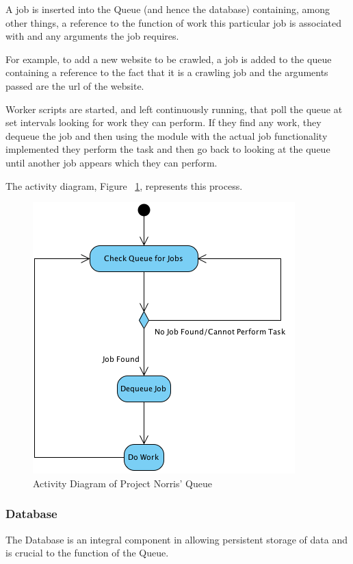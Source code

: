 \documentclass[12pt,a4paper]{article}
\begin{document}
A job is inserted into the Queue (and hence the database) containing, among other things, a reference to the function of work this particular job is associated with and any arguments the job requires.

For example, to add a new website to be crawled, a job is added to the queue containing a reference to the fact that it is a crawling job and the arguments passed are the url of the website.

Worker scripts are started, and left continuously running, that poll the queue at set intervals looking for work they can perform.  If they find any work, they dequeue the job and then using the module with the actual job functionality implemented they perform the task and then go back to looking at the queue until another job appears which they can perform.

The activity diagram, Figure ~\ref{fig:queue}, represents this process.

\begin{figure}[!ht]
    \begin{center}
        \includegraphics[scale=0.7]{images/queue_activity_diagram.png}    
    \end{center}
    \caption{Activity Diagram of Project Norris' Queue}
    \label{fig:queue}
\end{figure}

\subsubsection{Database}
The Database is an integral component in allowing persistent storage of data and is crucial to the function of the Queue. 
\end{document}

